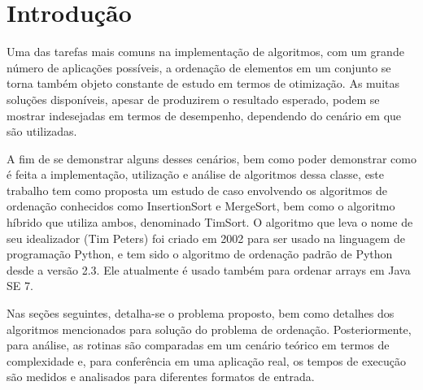 \chapter[Introdução]{Introdução}

Uma das tarefas mais comuns na implementação de algoritmos, com um grande número de aplicações possíveis, a ordenação de elementos em um conjunto se torna também objeto constante de estudo em termos de otimização. As muitas soluções disponíveis, apesar de produzirem o resultado esperado, podem se mostrar indesejadas em termos de desempenho, dependendo do cenário em que são utilizadas.

A fim de se demonstrar alguns desses cenários, bem como poder demonstrar como é feita a implementação, utilização e análise de algoritmos dessa classe, este trabalho tem como proposta um estudo de caso envolvendo os algoritmos de ordenação conhecidos como InsertionSort e MergeSort, bem como o algoritmo híbrido que utiliza ambos, denominado TimSort. O algoritmo que leva o nome de seu idealizador (Tim Peters) foi criado em 2002 para ser usado na linguagem de programação Python, e tem sido o algoritmo de ordenação padrão de Python desde a versão 2.3. Ele atualmente é usado também para ordenar arrays em Java SE 7.

Nas seções seguintes, detalha-se o problema proposto, bem como detalhes dos algoritmos mencionados para solução do problema de ordenação. Posteriormente, para análise, as rotinas são comparadas em um cenário teórico em termos de complexidade e, para conferência em uma aplicação real, os tempos de execução são medidos e analisados para diferentes formatos de entrada.

